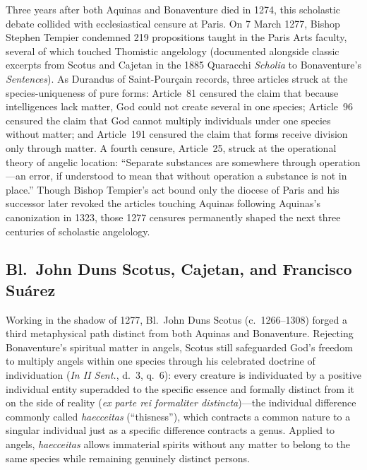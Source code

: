 Three years after both Aquinas and Bonaventure died in 1274, this scholastic debate collided with ecclesiastical censure at Paris. On 7 March 1277, Bishop Stephen Tempier condemned 219 propositions taught in the Paris Arts faculty, several of which touched Thomistic angelology (documented alongside classic excerpts from Scotus and Cajetan in the 1885 Quaracchi \emph{Scholia} to Bonaventure's \emph{Sentences}). As Durandus of Saint-Pour\c{c}ain records, three articles struck at the species-uniqueness of pure forms: Article~81 censured the claim that because intelligences lack matter, God could not create several in one species; Article~96 censured the claim that God cannot multiply individuals under one species without matter; and Article~191 censured the claim that forms receive division only through matter. A fourth censure, Article~25, struck at the operational theory of angelic location: ``Separate substances are somewhere through operation---an error, if understood to mean that without operation a substance is not in place.'' Though Bishop Tempier's act bound only the diocese of Paris and his successor later revoked the articles touching Aquinas following Aquinas's canonization in 1323, those 1277 censures permanently shaped the next three centuries of scholastic angelology.

\subsection{Bl.~John Duns Scotus, Cajetan, and Francisco Su\'arez}

Working in the shadow of 1277, Bl.~John Duns Scotus (c.~1266--1308) forged a third metaphysical path distinct from both Aquinas and Bonaventure. Rejecting Bonaventure's spiritual matter in angels, Scotus still safeguarded God's freedom to multiply angels within one species through his celebrated doctrine of individuation (\emph{In II Sent.}, d.~3, q.~6): every creature is individuated by a positive individual entity superadded to the specific essence and formally distinct from it on the side of reality (\emph{ex parte rei formaliter distincta})---the individual difference commonly called \emph{haecceitas} (``thisness''), which contracts a common nature to a singular individual just as a specific difference contracts a genus. Applied to angels, \emph{haecceitas} allows immaterial spirits without any matter to belong to the same species while remaining genuinely distinct persons.

